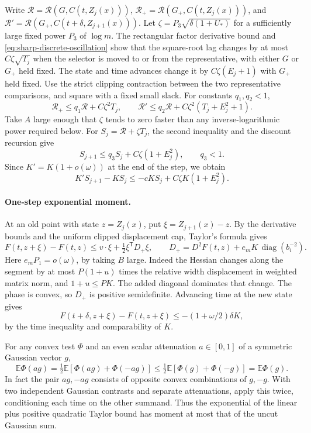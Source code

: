 \documentclass[11pt]{article}
\newcommand{\1}{\mathbf{1}}
\numberwithin{equation}{section}
\newcommand{\E}{\mathbb E}
\begin{document}
Write \(\mathcal R=\mathcal R(G,C(t,Z_j(x)))\),
\(\mathcal R_+=\mathcal R(G_+,C(t,Z_j(x)))\), and
\(\mathcal R'=\mathcal R(G_+,C(t+\delta,Z_{j+1}(x)))\).
Let
\(\zeta=P_3\sqrt{\delta(1+U_*)}\) for a sufficiently large
fixed power \(P_3\) of \(\log m\).
The rectangular factor derivative bound and
\eqref{eq:sharp-discrete-oscillation} show that the
square-root lag changes by at most \(C\zeta\sqrt{T_j}\)
when the selector is moved to or from the representative,
with either \(G\) or \(G_+\) held fixed.
The state and time advances change it by
\(C\zeta(E_j+1)\) with \(G_+\) held fixed.
Use the strict clipping contraction between the two
representative comparisons, and square with a fixed
small slack. For constants \(q_1,q_2<1\),
\begin{equation}\label{eq:sharp-discrete-lag}
 \mathcal R_+\le q_1\mathcal R+C\zeta^2 T_j,\qquad
 \mathcal R'\le q_2\mathcal R+
                  C\zeta^2(T_j+E_j^2+1).
\end{equation}
Take \(A\) large enough that \(\zeta\) tends to zero faster
than any inverse-logarithmic power required below.
For \(S_j=\mathcal R+\zeta T_j\), the second inequality and
the discount recursion give
\[
 S_{j+1}\le q_3 S_j+C\zeta(1+E_j^2),\qquad q_3<1 .
\]
Since \(K'=K(1+o(\omega))\) at the end of the step, we obtain
\begin{equation}\label{eq:sharp-discrete-memory}
 K'S_{j+1}-KS_j\le-cKS_j+C\zeta K(1+E_j^2).
\end{equation}

\paragraph{One-step exponential moment.}
At an old point with state \(z=Z_j(x)\), put
\(\xi=Z_{j+1}(x)-z\).
By the derivative bounds and the uniform clipped
displacement cap, Taylor's formula gives
\[
 F(t,z+\xi)-F(t,z)\le
 v\cdot\xi+\tfrac12\xi^{\mathsf T}D_+\xi,\qquad
 D_+=D^2F(t,z)+e_m K\,\operatorname{diag}(b_i^{-2}).
\]
Here \(e_mP_1=o(\omega)\), by taking \(B\) large.
Indeed the Hessian changes along the segment by at most
\(P(1+u)\) times the relative width displacement in weighted
matrix norm, and \(1+u\le PK\). The added diagonal dominates
that change. The phase is convex, so \(D_+\) is positive
semidefinite. Advancing time at the new state gives
\[
 F(t+\delta,z+\xi)-F(t,z+\xi)\le
 -(1+\omega/2)\delta K ,
\]
by the time inequality and comparability of \(K\).

For any convex test \(\Phi\) and an even scalar attenuation
\(a\in[0,1]\) of a symmetric Gaussian vector \(g\),
\[
 \E\Phi(ag)=\tfrac12\E[\Phi(ag)+\Phi(-ag)]
 \le \tfrac12\E[\Phi(g)+\Phi(-g)]=\E\Phi(g).
\]
In fact the pair \(ag,-ag\) consists of opposite convex
combinations of \(g,-g\). With two independent Gaussian
contrasts and separate attenuations, apply this twice,
conditioning each time on the other summand. Thus the
exponential of the linear plus positive quadratic Taylor
bound has moment at most that of the uncut Gaussian sum.
\end{document}
